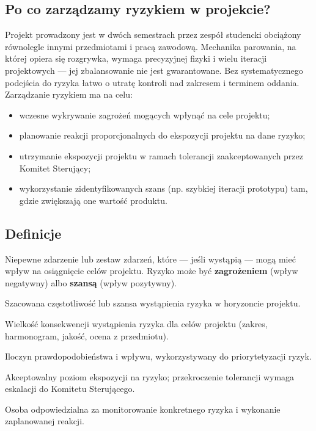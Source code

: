 \documentclass[11pt,a4paper]{article}
\begin{document}
	\subsection{Po co zarządzamy ryzykiem w projekcie?}
	Projekt prowadzony jest w dwóch semestrach przez zespół studencki obciążony równolegle
	innymi przedmiotami i pracą zawodową. Mechanika parowania, na której opiera się rozgrywka,
	wymaga precyzyjnej fizyki i wielu iteracji projektowych --- jej zbalansowanie nie jest
	gwarantowane. Bez systematycznego podejścia do ryzyka łatwo o utratę kontroli nad zakresem
	i terminem oddania. Zarządzanie ryzykiem ma na celu:
	\begin{itemize}[noitemsep]
		\item wczesne wykrywanie zagrożeń mogących wpłynąć na cele projektu;
		\item planowanie reakcji proporcjonalnych do ekspozycji projektu na dane ryzyko;
		\item utrzymanie ekspozycji projektu w ramach tolerancji zaakceptowanych przez Komitet Sterujący;
		\item wykorzystanie zidentyfikowanych szans (np. szybkiej iteracji prototypu) tam, gdzie zwiększają one wartość produktu.
	\end{itemize}
	
	\subsection{Definicje}
	\begin{description}[style=nextline, leftmargin=*]
		\item[Ryzyko] Niepewne zdarzenie lub zestaw zdarzeń, które --- jeśli wystąpią --- mogą mieć wpływ na osiągnięcie celów projektu. Ryzyko może być \textbf{zagrożeniem} (wpływ negatywny) albo \textbf{szansą} (wpływ pozytywny).
		\item[Prawdopodobieństwo] Szacowana częstotliwość lub szansa wystąpienia ryzyka w horyzoncie projektu.
		\item[Wpływ] Wielkość konsekwencji wystąpienia ryzyka dla celów projektu (zakres, harmonogram, jakość, ocena z przedmiotu).
		\item[Ekspozycja na ryzyko] Iloczyn prawdopodobieństwa i wpływu, wykorzystywany do priorytetyzacji ryzyk.
		\item[Tolerancja ryzyka] Akceptowalny poziom ekspozycji na ryzyko; przekroczenie tolerancji wymaga eskalacji do Komitetu Sterującego.
		\item[Właściciel ryzyka] Osoba odpowiedzialna za monitorowanie konkretnego ryzyka i wykonanie zaplanowanej reakcji.
	\end{description}
	
\end{document}
